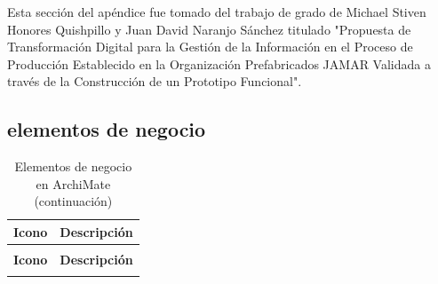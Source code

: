 Esta sección del apéndice fue tomado del trabajo de grado de Michael Stiven Honores Quishpillo y Juan David Naranjo Sánchez titulado "Propuesta de Transformación Digital para la Gestión de la Información en el Proceso de Producción Establecido en la Organización Prefabricados JAMAR Validada a través de la Construcción de un Prototipo Funcional". 

\subsection{elementos de negocio}

\begin{longtable}{|c|p{8cm}|}
\caption{Elementos de negocio en ArchiMate} \label{tab:elementos-negocio-archimate} \\
\hline
\textbf{Icono} & \textbf{Descripción} \\
\hline
\endfirsthead

\caption[]{Elementos de negocio en ArchiMate (continuación)} \\
\hline
\textbf{Icono} & \textbf{Descripción} \\
\hline
\endhead

\hline
\endfoot


\end{longtable}
